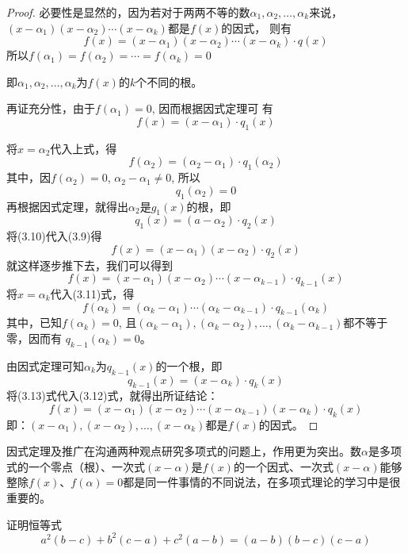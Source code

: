\begin{proof}
必要性是显然的，因为若对于两两不等的数$\alpha_1,\alpha_2,\ldots,\alpha_k$来说，$(x-\alpha_1)(x-\alpha_2)\cdots(x-\alpha_k)$都是$f(x)$的因式，
则有    
\[f(x)=(x-\alpha_1)(x-\alpha_2)\cdots(x-\alpha_k)\cdot q(x)\]
所以$f(\alpha_1)=f(\alpha_2) =\cdots=f(\alpha_k)=0$

即$\alpha_1,\alpha_2,\ldots,\alpha_k$为$f(x)$的$k$个不同的根。

再证充分性，由于$f(\alpha_1)=0$, 因而根据因式定理可
有
\begin{equation}
    f (x) = (x-\alpha_1) \cdot q_1 (x)
\end{equation}

将$x=\alpha_2$代入上式，得
\[f (\alpha_2) = (\alpha_2-\alpha_1) \cdot q_1(\alpha_2)\]
其中，因$f(\alpha_2)=0$, $\alpha_2-\alpha_1\ne 0$, 所以
\[q_1(\alpha_2)=0\]
再根据因式定理，就得出$\alpha_2$是$g_1(x)$的根，即
\begin{equation}
q_1(x)=(a-\alpha_2)\cdot q_2(x)
\end{equation}
将(3.10)代入(3.9)得
\begin{equation}
    f (x) = (x-\alpha_1) (x-\alpha_2)\cdot q_2(x)
\end{equation}
就这样逐步推下去，我们可以得到
\begin{equation}
    f (x) = (x-\alpha_1 ) (x-\alpha_2)\cdots(x-\alpha_{k-1})\cdot q_{k-1}(x) 
\end{equation}
将$x=\alpha_k$代入(3.11)式，得
\[f (\alpha_k) = (\alpha_k -\alpha_1)\cdots (\alpha_k-\alpha_{k-1})\cdot q_{k-1}(\alpha_k)\]
其中，已知$f(\alpha_k)=0$, 且$(\alpha_k-\alpha_1),(\alpha_{k}-\alpha_2),\ldots,(\alpha_k-\alpha_{k-1})$都不等于零，因而有 $q_{k-1}(\alpha_k)=0$。

由因式定理可知$\alpha_k$为$q_{k-1}(x)$的一个根，即
\begin{equation}
    q_{k-1}(x)=(x-\alpha_k)\cdot q_{k}(x)
\end{equation}
将(3.13)式代入(3.12)式，就得出所证结论：
\[f(x)=(x-\alpha_1)(x-\alpha_2)\cdots(x-\alpha_{k-1})(x-\alpha_k)\cdot q_k(x)\]
即：$(x-\alpha_1),(x-\alpha_2),\ldots,(x-\alpha_k)$都是$f(x)$的因式。
\end{proof}

因式定理及推广在沟通两种观点研究多项式的问题上，作用更为突出。数$\alpha$是多项式的一个零点（根）、一次式$(x-\alpha)$是$f(x)$的一个因式、一次式$(x-\alpha)$能够整除$f(x)$、$f(\alpha)=0$都是同一件事情的不同说法，在多项式理论的学习中是很重要的。


\begin{example}
证明恒等式
\[a^2(b-c)+b^2(c-a)+c^2(a-b)=(a-b)(b-c)(c-a)\]
\end{example}


